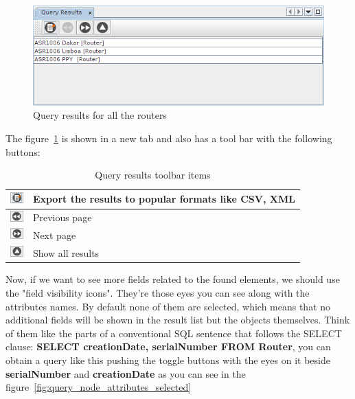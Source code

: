 \documentclass[a4paper]{article}
\begin{document}
	\begin{figure}[h!]
		\centering
		\includegraphics[width=0.9\linewidth]{img/query_results.png}
		\caption{Query results for all the routers}
		\label{fig:query_results}
	\end{figure}
	
	\newpage
	The figure~\ref{fig:query_results} is shown in a new tab and also has a tool bar with the following buttons:
	
	\begin{table}[h!]
		\centering
		\begin{tabular}{cl}
			\includegraphics[width=0.5cm]{img/query_result_export.png} & Export the results to popular formats like CSV, XML\\
			\midrule
			\includegraphics[width=0.5cm]{img/query_results_previous_page.png} & Previous page\\
			\midrule
			\includegraphics[width=0.5cm]{img/query_results_next_page.png} & Next page\\
			\midrule
			\includegraphics[width=0.5cm]{img/query_results_all_results.png} & Show all results\\
		\end{tabular}	
		\caption{Query results toolbar items}
		\label{tab:query_results_toolbar_icons}
	\end{table}
	
	Now, if we want to see more fields related to the found elements, we should use the "field visibility icons". They're those eyes you can see along with the attributes names. By default none of them are selected, which means that no additional fields will be shown in the result list but the objects themselves. Think of them like the parts of a conventional SQL sentence that follows the SELECT clause: \textbf{SELECT creationDate, serialNumber FROM Router}, you can obtain a query like this pushing the toggle buttons with the eyes on it beside \textbf{serialNumber} and \textbf{creationDate} as you can see in the figure~\ref{fig:query_node_attributes_selected}
	
\end{document}

